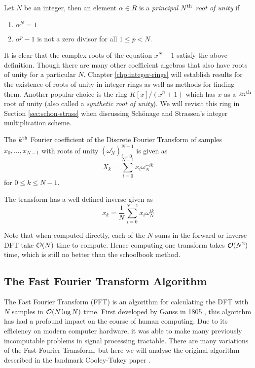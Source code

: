 \begin{definition}
  Let $N$ be an integer, then an element $\alpha \in R$ is a \emph{principal $N^{\textrm{th}}$ root of unity} if
  \begin{enumerate}
    \item $\alpha^N = 1$
    \item $\alpha^p - 1$ is not a zero divisor for all $1 \leq p < N$.
  \end{enumerate}
\end{definition}

It is clear that the complex roots of the equation $x^N - 1$ satisfy the above definition. Though there are many other coefficient algebras that also have roots of unity for a particular $N$. Chapter \ref{chp:integer-rings} will establish results for the existence of roots of unity in integer rings as well as methods for finding them. Another popular choice is the ring $K[x]/(x^n + 1)$ which has $x$ as a $2n^{\textrm{th}}$ root of unity (also called a \textit{synthetic root of unity}). We will revisit this ring in Section \ref{sec:schon-strass} when discussing Sch\"{o}nage and Strassen's integer multiplication scheme. 

\begin{definition}
    The $k^{\textrm{th}}$ Fourier coefficient of the Discrete Fourier Transform of samples $x_0, \ldots, x_{N-1}$ with roots of unity $(\omega_N^i)_{i=0}^{N-1}$ is given as
    \[
        X_k = \sum^{N-1}_{i=0}x_i\omega_{N}^{-ik}
    \]
    for $0 \leq k \leq N-1$.

    The transform has a well defined inverse given as 
    \[
        x_k = \frac{1}{N}\sum^{N-1}_{i=0}x_i\omega_{N}^{ik}
    \]
\end{definition}

Note that when computed directly, each of the $N$ sums in the forward or inverse DFT take $\mathcal O(N)$ time to compute. Hence computing one transform takes $\mathcal O(N^2)$ time, which is still no better than the schoolbook method.

\subsection{The Fast Fourier Transform Algorithm}

The Fast Fourier Transform (FFT) is an algorithm for calculating the DFT with $N$ samples in $\mathcal O(N \log N)$ time. First developed by Gauss in 1805 \cite{gauss}, this algorithm has had a profound impact on the course of human computing. Due to its efficiency on modern computer hardware, it was able to make many previously incomputable problems in signal processing tractable.
There are many variations of the Fast Fourier Transform, but here we will analyse the original algorithm described in the landmark Cooley-Tukey paper \cite{fft}.

